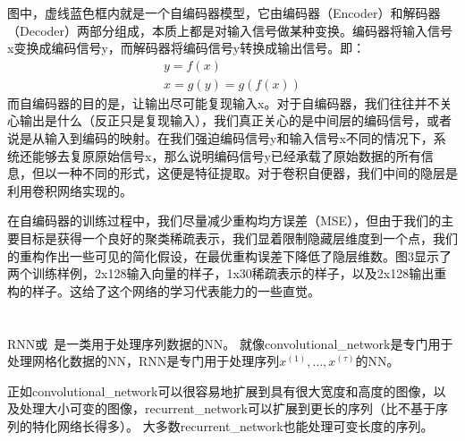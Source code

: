 图中，虚线蓝色框内就是一个自编码器模型，它由编码器（Encoder）和解码器（Decoder）两部分组成，本质上都是对输入信号做某种变换。编码器将输入信号x变换成编码信号y，而解码器将编码信号y转换成输出信号。即：
\begin{equation}
	\begin{gathered}
		y=f(x)
		\\
		x=g(y)=g(f(x))
	\end{gathered}
\end{equation}
而自编码器的目的是，让输出尽可能复现输入x。对于自编码器，我们往往并不关心输出是什么（反正只是复现输入），我们真正关心的是中间层的编码信号，或者说是从输入到编码的映射。在我们强迫编码信号y和输入信号x不同的情况下，系统还能够去复原原始信号x，那么说明编码信号y已经承载了原始数据的所有信息，但以一种不同的形式，这便是特征提取。对于卷积自便器，我们中间的隐层是利用卷积网络实现的。\par

在自编码器的训练过程中，我们尽量减少重构均方误差（MSE），但由于我们的主要目标是获得一个良好的聚类稀疏表示，我们显着限制隐藏层维度到一个点，我们的重构作出一些可见的简化假设，在最优重构误差下降低了隐层维数。图3显示了两个训练样例，2x128输入向量的样子，1x30稀疏表示的样子，以及2x128输出重构的样子。这给了这个网络的学习代表能力的一些直觉。\par


\section{}
\label{sec:lstm}
\label{chap:sequence_modeling_recurrent_and_recursive_nets}
\gls{RNN}或~是一类用于处理序列数据的\gls{NN}。
就像\gls{convolutional_network}是专门用于处理网格化数据的\gls{NN}，\gls{RNN}是专门用于处理序列$x^{(1)}, \dots, x^{(\tau)}$的\gls{NN}。

正如\gls{convolutional_network}可以很容易地扩展到具有很大宽度和高度的图像，以及处理大小可变的图像，\gls{recurrent_network}可以扩展到更长的序列（比不基于序列的特化网络长得多）。
大多数\gls{recurrent_network}也能处理可变长度的序列。

